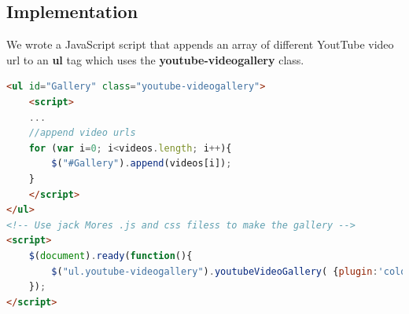 \newpage
\subsection{Implementation}
We wrote a JavaScript script that appends an array of different YoutTube video url to an \textbf{ul} tag which uses the \textbf{youtube-videogallery} class.   

\begin{lstlisting}[language=html, caption= 
extracts from the video gallery src]
<ul id="Gallery" class="youtube-videogallery">
	<script>
	... 
	//append video urls
	for (var i=0; i<videos.length; i++){
		$("#Gallery").append(videos[i]);
	}
	</script>
</ul>
<!-- Use jack Mores .js and css filess to make the gallery -->
<script>
    $(document).ready(function(){
        $("ul.youtube-videogallery").youtubeVideoGallery( {plugin:'colorbox',assetFolder:'../'} );
    });
</script> 
\end{lstlisting}